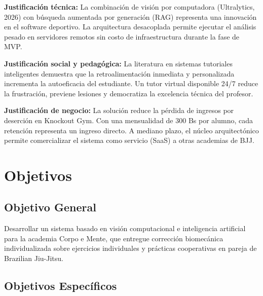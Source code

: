 \documentclass[12pt,letterpaper]{article}
\begin{document}
\textbf{Justificación técnica:} La combinación de visión por computadora (Ultralytics, 2026) con búsqueda aumentada por generación (RAG) representa una innovación en el software deportivo. La arquitectura desacoplada permite ejecutar el análisis pesado en servidores remotos sin costo de infraestructura durante la fase de MVP.

\vspace{0.3cm}
\textbf{Justificación social y pedagógica:} La literatura en sistemas tutoriales inteligentes demuestra que la retroalimentación inmediata y personalizada incrementa la autoeficacia del estudiante. Un tutor virtual disponible 24/7 reduce la frustración, previene lesiones y democratiza la excelencia técnica del profesor.

\vspace{0.3cm}
\textbf{Justificación de negocio:} La solución reduce la pérdida de ingresos por deserción en Knockout Gym. Con una mensualidad de 300 Bs por alumno, cada retención representa un ingreso directo. A mediano plazo, el núcleo arquitectónico permite comercializar el sistema como servicio (SaaS) a otras academias de BJJ.

\section{Objetivos}

\subsection{Objetivo General}

Desarrollar un sistema basado en visión computacional e inteligencia artificial para la academia Corpo e Mente, que entregue corrección biomecánica individualizada sobre ejercicios individuales y prácticas cooperativas en pareja de Brazilian Jiu-Jitsu.

\subsection{Objetivos Específicos}
\end{document}
